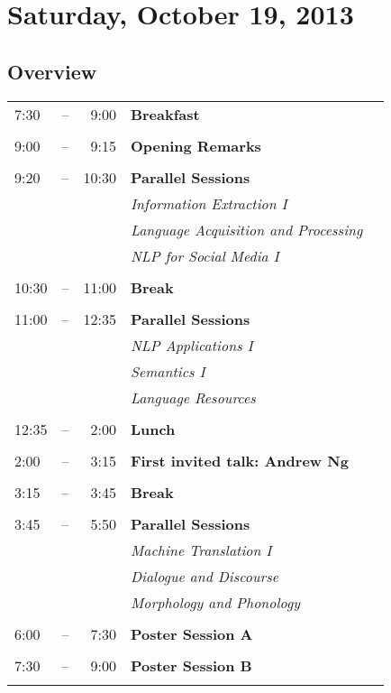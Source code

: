 \documentclass[twoside,makeidx]{book}
\begin{document}
\setcounter{tocdepth}{2}
\tableofcontents
\mainmatter

\chapter{Saturday, October 19, 2013}
\section*{Overview}
\begin{tabular}{ l @{} c @{} r l l }
7:30 & -- & 9:00 & \textbf{Breakfast} \hfill \\
\\
9:00 & -- & 9:15 & \textbf{Opening Remarks} \hfill \\
\\
9:20 & -- & 10:30 & \textbf{Parallel Sessions} \hfill \\
 & & & \textit{Information Extraction I} \\
 & & & \textit{Language Acquisition and Processing} \\
 & & & \textit{NLP for Social Media I} \\
\\
10:30 & -- & 11:00 & \textbf{Break} \hfill \\
\\
11:00 & -- & 12:35 & \textbf{Parallel Sessions} \hfill \\
 & & & \textit{NLP Applications I} \\
 & & & \textit{Semantics I} \\
 & & & \textit{Language Resources} \\
\\
12:35 & -- & 2:00 & \textbf{Lunch} \hfill \\
\\
2:00 & -- & 3:15 & \textbf{First invited talk: Andrew Ng} \hfill \\
\\
3:15 & -- & 3:45 & \textbf{Break} \hfill \\
\\
3:45 & -- & 5:50 & \textbf{Parallel Sessions} \hfill \\
 & & & \textit{Machine Translation I} \\
 & & & \textit{Dialogue and Discourse} \\
 & & & \textit{Morphology and Phonology} \\
\\
6:00 & -- & 7:30 & \textbf{Poster Session A} \hfill \\
\\
7:30 & -- & 9:00 & \textbf{Poster Session B} \hfill \\
\\
\end{tabular}
\clearpage
\end{document}
